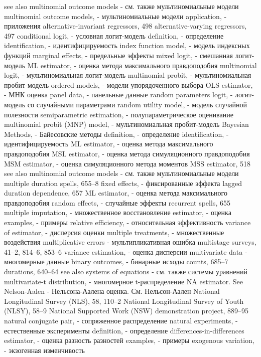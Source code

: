 see also multinomial outcome models - см. также мультиномиальные модели
multinomial outcome models, - мультиномиальные модели
application, - приложения
alternative-invariant regressors, 498 alternative-varying regressors, 497 
conditional logit, - условная логит-модель
definition, - определение
identification, - идентифицируемость
index function model, - модель индексных функций
marginal effects, - предельные эффекты 
mixed logit, - смешанная логит-модель
ML estimator, - оценка метода максимального правдоподобия
multinomial logit, - мультиномиальная логит-модель
multinomial probit, - мультиномиальная пробит-модель
ordered models, - модели упорядоченного выбора
OLS estimator, - МНК оценка
panel data, - панельные данные
random parameters logit, - логит-модель со случайными параметрами
random utility model, - модель случайной полезности
semiparametric estimation, - полупараметрическое оценивание
multinomial probit (MNP) model, - мультиномиальная пробит-модель
Bayesian Methods, - Байесовские методы
definition, - определение
identification, - идентифицируемость
ML estimator, - оценка метода максимального правдоподобия
MSL estimator, - оценка метода симуляционного правдоподобия
MSM estimator, - оценка симуляционного метода моментов
MSS estimator, 518
see also multinomial outcome models - см. также мультиномиальные модели
multiple duration spells, 655–8 
fixed effects, - фиксированные эффекта
lagged duration dependence, 657 
ML estimator, - оценка метода максимального правдоподобия
random effects, - случайные эффекты
recurrent spells, 655 
multiple imputation, - множественное восстановление
estimator, - оценка
examples, - примеры
relative efficiency, - относительная эффективность 
variance of estimator, - дисперсия оценки
multiple treatments, - множественные воздействия
multiplicative errors - мультипликативная ошибка
multistage surveys, 41–2, 814–6, 853–6
variance estimation, - оценка дисперсии 
multivariate data - многомерные данные
binary outcomes, - бинарные исходы 
counts, 685–7
durations, 640–64
see also systems of equations - см. также системы уравнений
multivariate-t distribution, - многомерное t-распределение
NA estimator. See Nelson-Aalen - Нельсона-Аалена оценка. См. Нельсон-Аален
National Longitudinal Survey (NLS), 58, 110–2 National Longitudinal Survey of Youth (NLSY),
58–9
National Supported Work (NSW) demonstration
project, 889–95
natural conjugate pair, - сопряженное распределение 
natural experiments, - естественные эксперименты
definition, - определение
differences-in-differences estimator, - оценка разность разностей
examples, - примеры
exogenous variation, - экзогенная изменчивость 
